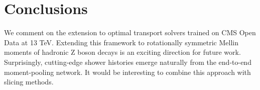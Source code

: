 \section{Conclusions}\label{sec:conclusions}

We comment on the extension to optimal transport solvers trained on CMS
Open Data at 13 TeV. Extending this framework to rotationally symmetric
Mellin moments of hadronic Z boson decays is an exciting direction for
future work. Surprisingly, cutting-edge shower histories emerge
naturally from the end-to-end moment-pooling network. It would be
interesting to combine this approach with slicing methods.

